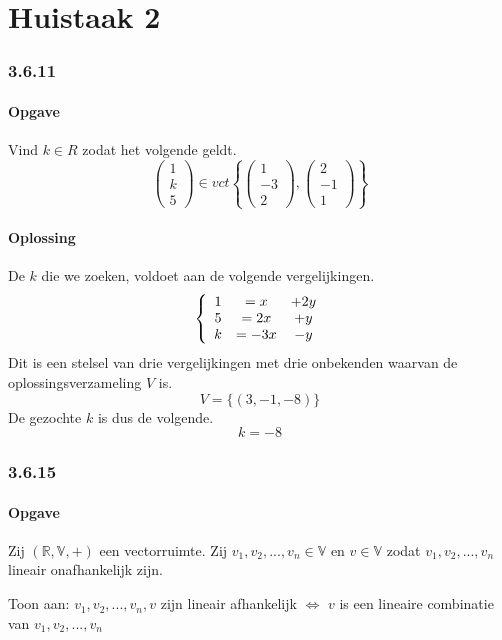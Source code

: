 \documentclass[lineaire_algebra_oplossingen.tex]{subfiles}
\begin{document}
\part{Huistaak 2}

\section{3.6.11}
\subsection{Opgave}
Vind $k\in R$ zodat het volgende geldt.
\[
\begin{pmatrix}
1\\k\\5
\end{pmatrix}
\in 
vct
\left\lbrace
\begin{pmatrix}
1\\-3\\2
\end{pmatrix}
,
\begin{pmatrix}
2\\-1\\1
\end{pmatrix}
\right\rbrace
\]
\subsection{Oplossing}
De $k$ die we zoeken, voldoet aan de volgende vergelijkingen.
\[
\left\lbrace
\begin{array}{c c c}
1 &= x   &+ 2y\\
5 &= 2x  &+ y\\
k &= -3x &- y\\
\end{array}
\right.
\]
Dit is een stelsel van drie vergelijkingen met drie onbekenden waarvan de oplossingsverzameling $V$ is.
\[
V = \{ (3,-1,-8) \}
\]
De gezochte $k$ is dus de volgende.
\[
k = -8
\]
\pagebreak
\section{3.6.15}
\subsection{Opgave}
Zij $(\mathbb{R},\mathbb{V},+)$ een vectorruimte.
Zij $v_1,v_2,...,v_n \in \mathbb{V}$ en $v \in \mathbb{V}$ zodat $v_1,v_2,...,v_n$ lineair onafhankelijk zijn.

Toon aan:
$v_1,v_2,...,v_n, v$ zijn lineair afhankelijk $\Leftrightarrow$ $v$ is een lineaire combinatie van $v_1,v_2,...,v_n$
\end{document}
